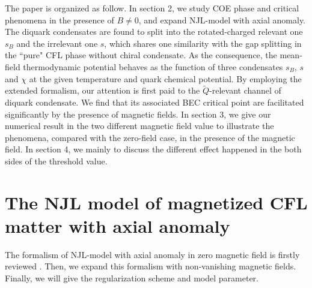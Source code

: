 \documentclass[prd, showpacs,nofootinbib,amsmath,amssymb,12pt]{revtex4}
\begin{document}
The paper is organized as follow.
In section 2, we study COE phase and critical phenomena in the presence of $B\neq0$, and expand NJL-model with axial anomaly.
The diquark condensates are found to split into the rotated-charged relevant one $s_B$ and the irrelevant one $s$,
which shares one similarity with the gap splitting in the ``pure" CFL phase without chiral condensate.
As the consequence, the mean-field thermodynamic potential behaves as the function of three condensates $s_B$,
$s$ and $\chi$ at the given temperature and quark chemical potential.
By employing the extended formalism, our attention is first paid to the ${\widetilde{Q}}$-relevant channel of diquark condensate.
We find that its associated BEC critical point are facilitated significantly by the presence of magnetic fields.
In section 3, we give our numerical result in the two different magnetic field value to illustrate the phenomena,
compared with the zero-field case, in the presence of the magnetic field.
In section 4, we mainly to discuss the different effect happened in the both sides of the threshold value.

\section{The NJL model of magnetized CFL matter with axial anomaly}

The formalism of NJL-model with axial anomaly in zero magnetic field is firstly reviewed \cite{abuki2010nambu}.
Then, we expand this formalism with non-vanishing magnetic fields.
Finally, we will give the regularization scheme and model parameter.
\end{document}
